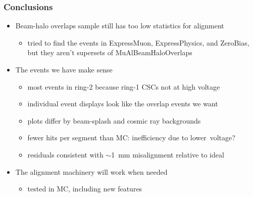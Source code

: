 \documentclass[compress]{beamer}
\begin{document}
\begin{frame}
\frametitle{Conclusions}
\begin{itemize}\setlength{\itemsep}{0.5 cm}
\item Beam-halo overlaps sample still has too low statistics for alignment
\begin{itemize}
\item tried to find the events in ExpressMuon, ExpressPhysics, and ZeroBias, but they aren't supersets of MuAlBeamHaloOverlaps
\end{itemize}

\item The events we have make sense
\begin{itemize}\setlength{\itemsep}{0.1 cm}
\item most events in ring-2 because ring-1 CSCs not at high voltage
\item individual event displays look like the overlap events we want
\item plots differ by beam-splash and cosmic ray backgrounds
\item fewer hits per segment than MC: inefficiency due to \mbox{lower voltage?\hspace{-1 cm}}
\item residuals consistent with $\sim$1~mm misalignment relative to ideal
\end{itemize}

\item The alignment machinery will work when needed
\begin{itemize}
\item tested in MC, including new features
\end{itemize}
\end{itemize}
\label{numpages}
\end{frame}
\end{document}
